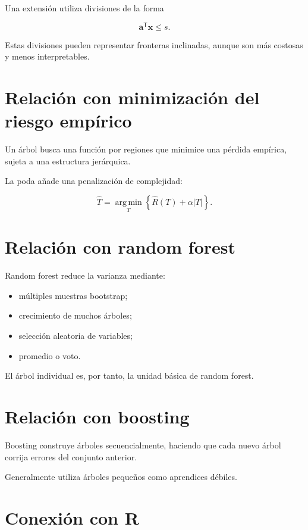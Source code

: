 \documentclass[
  spanish,
  11pt,
  letterpaper,
  DIV=11,
  numbers=noendperiod]{scrreprt}
\providecommand{\tightlist}{%
  \setlength{\itemsep}{0pt}\setlength{\parskip}{0pt}}
\theoremstyle{definition}
\theoremstyle{plain}
\theoremstyle{definition}
\theoremstyle{remark}
\begin{document}
Una extensión utiliza divisiones de la forma

\[
\mathbf{a}^{\mathsf T}\mathbf{x}\leq s.
\]

Estas divisiones pueden representar fronteras inclinadas, aunque son más
costosas y menos interpretables.

\section{Relación con minimización del riesgo
empírico}\label{relaciuxf3n-con-minimizaciuxf3n-del-riesgo-empuxedrico}

Un árbol busca una función por regiones que minimice una pérdida
empírica, sujeta a una estructura jerárquica.

La poda añade una penalización de complejidad:

\[
\widehat{T}
=
\operatorname*{arg\,min}_{T}
\left\{
\widehat{R}(T)+\alpha |T|
\right\}.
\]

\section{Relación con random
forest}\label{relaciuxf3n-con-random-forest}

Random forest reduce la varianza mediante:

\begin{itemize}
\tightlist
\item
  múltiples muestras bootstrap;
\item
  crecimiento de muchos árboles;
\item
  selección aleatoria de variables;
\item
  promedio o voto.
\end{itemize}

El árbol individual es, por tanto, la unidad básica de random forest.

\section{Relación con boosting}\label{relaciuxf3n-con-boosting}

Boosting construye árboles secuencialmente, haciendo que cada nuevo
árbol corrija errores del conjunto anterior.

Generalmente utiliza árboles pequeños como aprendices débiles.

\section{Conexión con R}\label{conexiuxf3n-con-r-12}
\end{document}

